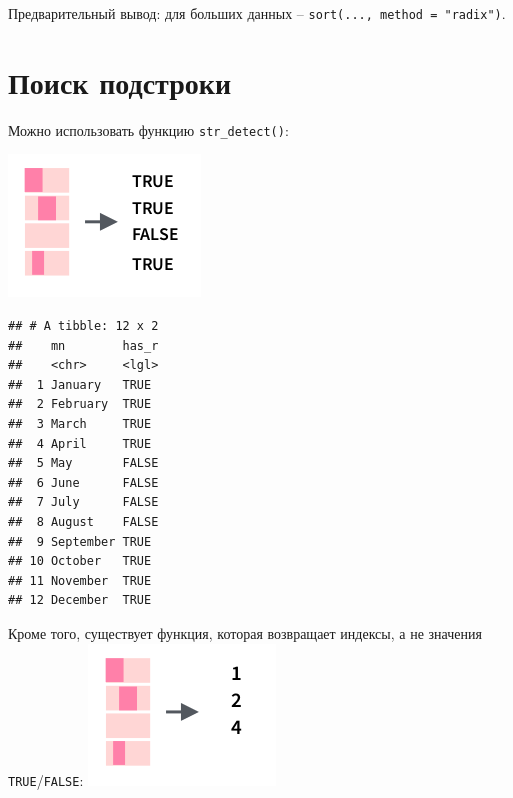 \documentclass[
]{book}
\newenvironment{Shaded}{\begin{snugshade}}{\end{snugshade}}
\newcommand{\DataTypeTok}[1]{\textcolor[rgb]{0.13,0.29,0.53}{#1}}
\newcommand{\KeywordTok}[1]{\textcolor[rgb]{0.13,0.29,0.53}{\textbf{#1}}}
\newcommand{\NormalTok}[1]{#1}
\newcommand{\OperatorTok}[1]{\textcolor[rgb]{0.81,0.36,0.00}{\textbf{#1}}}
\newcommand{\StringTok}[1]{\textcolor[rgb]{0.31,0.60,0.02}{#1}}
\begin{document}
Предварительный вывод: для больших данных -- \texttt{sort(...,\ method\ =\ "radix")}.

\hypertarget{ux43fux43eux438ux441ux43a-ux43fux43eux434ux441ux442ux440ux43eux43aux438}{%
\section{Поиск подстроки}\label{ux43fux43eux438ux441ux43a-ux43fux43eux434ux441ux442ux440ux43eux43aux438}}

Можно использовать функцию \texttt{str\_detect()}:

\includegraphics{images/5.04_str_detect.png}

\begin{Shaded}
\end{Shaded}

\begin{verbatim}
## # A tibble: 12 x 2
##    mn        has_r
##    <chr>     <lgl>
##  1 January   TRUE 
##  2 February  TRUE 
##  3 March     TRUE 
##  4 April     TRUE 
##  5 May       FALSE
##  6 June      FALSE
##  7 July      FALSE
##  8 August    FALSE
##  9 September TRUE 
## 10 October   TRUE 
## 11 November  TRUE 
## 12 December  TRUE
\end{verbatim}

Кроме того, существует функция, которая возвращает индексы, а не значения \texttt{TRUE}/\texttt{FALSE}:
\includegraphics{images/5.05_str_which.png}
\end{document}
